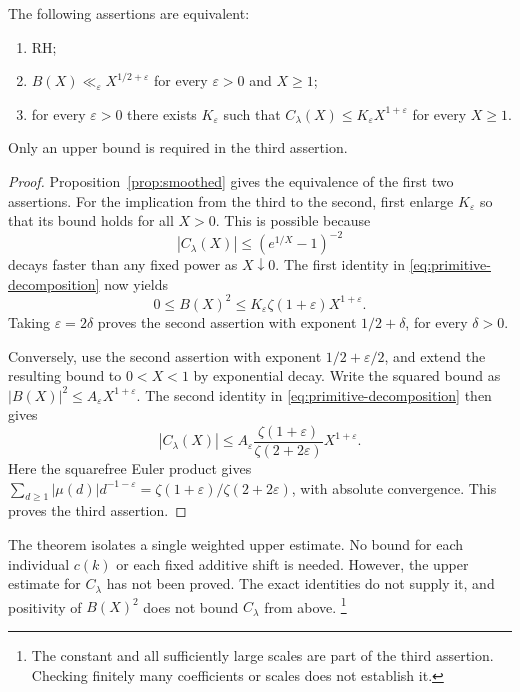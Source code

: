 \begin{theorem}
\label{thm:primitive-rh-criterion}
The following assertions are equivalent:
\begin{enumerate}
 \item RH;
 \item $B(X)\ll_\varepsilon X^{1/2+\varepsilon}$ for every
       $\varepsilon>0$ and $X\ge1$;
 \item for every $\varepsilon>0$ there exists $K_\varepsilon$ such that
       $C_\lambda(X)\le K_\varepsilon X^{1+\varepsilon}$ for every
       $X\ge1$.
\end{enumerate}
Only an upper bound is required in the third assertion.
\end{theorem}
\begin{proof}
Proposition~\ref{prop:smoothed} gives the equivalence of the first two
assertions. For the implication from the third to the second, first
enlarge $K_\varepsilon$ so that its bound holds for all $X>0$. This
is possible because
\[
 |C_\lambda(X)|\le(e^{1/X}-1)^{-2}
\]
decays faster than any fixed power as $X\downarrow0$. The first
identity in \eqref{eq:primitive-decomposition} now yields
\begin{equation}\label{eq:primitive-upper-transfer}
 0\le B(X)^2\le K_\varepsilon\zeta(1+\varepsilon)X^{1+\varepsilon}.
\end{equation}
Taking $\varepsilon=2\delta$ proves the second assertion with exponent
$1/2+\delta$, for every $\delta>0$.

Conversely, use the second assertion with exponent
$1/2+\varepsilon/2$, and extend the resulting bound to $0<X<1$
by exponential decay. Write the squared bound as
$|B(X)|^2\le A_\varepsilon X^{1+\varepsilon}$. The second identity
in \eqref{eq:primitive-decomposition} then gives
\begin{equation}\label{eq:primitive-absolute-converse}
 |C_\lambda(X)|\le
 A_\varepsilon\frac{\zeta(1+\varepsilon)}{\zeta(2+2\varepsilon)}
 X^{1+\varepsilon}.
\end{equation}
Here the squarefree Euler product gives
$\sum_{d\ge1}|\mu(d)|d^{-1-\varepsilon}
=\zeta(1+\varepsilon)/\zeta(2+2\varepsilon)$, with absolute
convergence. This proves the third assertion.
\end{proof}

The theorem isolates a single weighted upper estimate. No bound for
each individual $c(k)$ or each fixed additive shift is needed.
However, the upper estimate for $C_\lambda$ has not been proved.
The exact identities do not supply it, and positivity of $B(X)^2$
does not bound $C_\lambda$ from above.
\footnote{The constant and all sufficiently large scales are part of
the third assertion. Checking finitely many coefficients or scales
does not establish it.}

